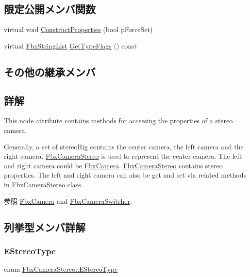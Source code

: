 \subsection*{限定公開メンバ関数}
\begin{DoxyCompactItemize}
\item 
virtual void \hyperlink{class_fbx_camera_stereo_a83a9b1ee59d0014b30411fe4877b5dec}{Construct\+Properties} (bool p\+Force\+Set)
\item 
virtual \hyperlink{class_fbx_string_list}{Fbx\+String\+List} \hyperlink{class_fbx_camera_stereo_a73c9df71edcd9a56b2710357b95fcde6}{Get\+Type\+Flags} () const
\end{DoxyCompactItemize}
\subsection*{その他の継承メンバ}


\subsection{詳解}
This node attribute contains methods for accessing the properties of a stereo camera.

Generally, a set of stereo\+Rig contains the center camera, the left camera and the right camera. \hyperlink{class_fbx_camera_stereo}{Fbx\+Camera\+Stereo} is used to represent the center camera. The left and right camera could be \hyperlink{class_fbx_camera}{Fbx\+Camera}. \hyperlink{class_fbx_camera_stereo}{Fbx\+Camera\+Stereo} contains stereo properties. The left and right camera can also be get and set via related methods in \hyperlink{class_fbx_camera_stereo}{Fbx\+Camera\+Stereo} class. \begin{DoxySeeAlso}{参照}
\hyperlink{class_fbx_camera}{Fbx\+Camera} and \hyperlink{class_fbx_camera_switcher}{Fbx\+Camera\+Switcher}. 
\end{DoxySeeAlso}


\subsection{列挙型メンバ詳解}
\mbox{\label{class_fbx_camera_stereo_acb0f27675a73de0858983b703196cb37}} 
\subsubsection{\texorpdfstring{E\+Stereo\+Type}{EStereoType}}
{\footnotesize\ttfamily enum \hyperlink{class_fbx_camera_stereo_acb0f27675a73de0858983b703196cb37}{Fbx\+Camera\+Stereo\+::\+E\+Stereo\+Type}}

